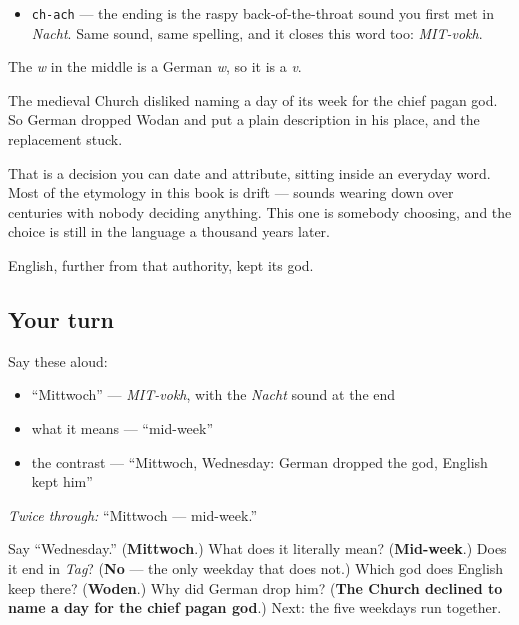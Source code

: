 \begin{sounds}
\begin{itemize}
\raggedright
  \item \texttt{ch-ach} — the ending is the raspy back-of-the-throat sound you first met in \emph{Nacht}. Same sound, same spelling, and it closes this word too: \emph{MIT-vokh}.
\end{itemize}

The \emph{w} in the middle is a German \emph{w}, so it is a \emph{v}.
\end{sounds}

\begin{culture}
The medieval Church disliked naming a day of its week for the chief pagan god. So German dropped Wodan and put a plain description in his place, and the replacement stuck.

That is a decision you can date and attribute, sitting inside an everyday word. Most of the etymology in this book is drift — sounds wearing down over centuries with nobody deciding anything. This one is somebody choosing, and the choice is still in the language a thousand years later.

English, further from that authority, kept its god.
\end{culture}

\subsection*{Your turn}
Say these aloud:

\begin{itemize}
\raggedright
  \item \textquotedblleft{}Mittwoch\textquotedblright{} — \emph{MIT-vokh}, with the \emph{Nacht} sound at the end
  \item what it means — \textquotedblleft{}mid-week\textquotedblright{}
  \item the contrast — \textquotedblleft{}Mittwoch, Wednesday: German dropped the god, English kept him\textquotedblright{}
\end{itemize}

\emph{Twice through:} \textquotedblleft{}Mittwoch — mid-week.\textquotedblright{}

\begin{tcolorbox}[breakable,colback=teal!4,colframe=teal!35!black,title={Before you move on}]
Say \textquotedblleft{}Wednesday.\textquotedblright{} (\textbf{Mittwoch}.) What does it literally mean? (\textbf{Mid-week}.) Does it end in \emph{Tag}? (\textbf{No} — the only weekday that does not.) Which god does English keep there? (\textbf{Woden}.) Why did German drop him? (\textbf{The Church declined to name a day for the chief pagan god}.) Next: the five weekdays run together.
\end{tcolorbox}
